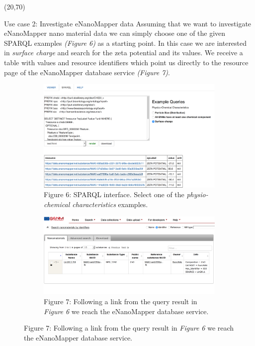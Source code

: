 \documentclass[final]{beamer}
\begin{document}
\begin{frame}{}
        
    \begin{textblock}{63}(20,70)
      \justifying
      \begin{block}{Use case 2: Investigate eNanoMapper data}
        Assuming that we want to investigate eNanoMapper nano material data we can simply choose one of the given SPARQL examples \emph{(Figure 6)} as a starting point. In this case we are interested in \emph{surface charge} and search for the zeta potential and its values. We receive a table with values and resource identifiers which point us directly to the resource page of the eNanoMapper database service \emph{(Figure 7)}.
        \begin{figure}
          \vspace{0.01\textwidth}
          \hspace{-0.15\textwidth}
          \begin{subfigure}[c]{0.35\textwidth}
            \includegraphics[scale=0.75,keepaspectratio]{onto-use-case-2a.png}
            \caption{Figure 6: SPARQL interface. Select one of the \emph{physio-chemical characteristics} examples.}
          \end{subfigure}
          \hspace{0.12\textwidth}
          \begin{subfigure}[c]{0.35\textwidth}
            \vspace{0.1\textwidth}
            \includegraphics[scale=0.75,keepaspectratio]{onto-use-case-2b.png}
            \caption{Figure 7: Following a link from the query result in \emph{Figure 6} we reach the eNanoMapper database service.}
          \end{subfigure}
        \end{figure}
      \end{block}
    \end{textblock}
    

\end{frame}
\end{document}
